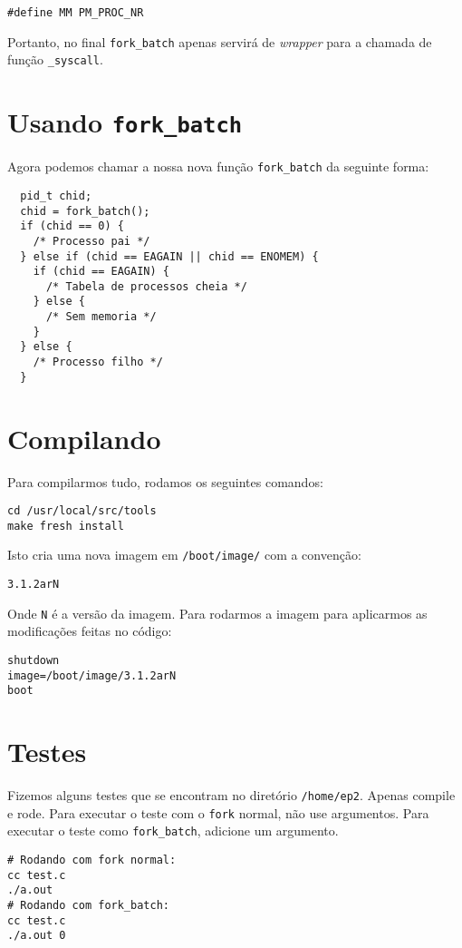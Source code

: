\documentclass{amsart}
\theoremstyle{plain}
\newcommand{\code}[1]{\lstinline[mathescape=true]{#1}}
\begin{document}
\begin{lstlisting}[frame=leftline,mathescape=true,style=nonumbers]
#define MM PM_PROC_NR
\end{lstlisting}

Portanto, no final \code{fork_batch} apenas servirá de \textit{wrapper} para a chamada de função
\code{_syscall}.

\section{Usando \code{fork_batch}}

Agora podemos chamar a nossa nova função \code{fork_batch} da seguinte forma:

\begin{verbatim}
  pid_t chid;
  chid = fork_batch();
  if (chid == 0) {
    /* Processo pai */
  } else if (chid == EAGAIN || chid == ENOMEM) {
    if (chid == EAGAIN) {
      /* Tabela de processos cheia */
    } else {
      /* Sem memoria */
    }
  } else {
    /* Processo filho */
  }
\end{verbatim}

\section{Compilando}

Para compilarmos tudo, rodamos os seguintes comandos:

\begin{lstlisting}[frame=leftline,mathescape=true,style=nonumbers]
cd /usr/local/src/tools
make fresh install
\end{lstlisting}

Isto cria uma nova imagem em \code{/boot/image/} com a convenção:

\begin{lstlisting}[frame=leftline,mathescape=true,style=nonumbers]
3.1.2arN
\end{lstlisting}

Onde \code{N} é a versão da imagem. Para rodarmos a imagem para aplicarmos as modificações feitas
no código:

\begin{lstlisting}[frame=leftline,mathescape=true,style=nonumbers]
shutdown
image=/boot/image/3.1.2arN
boot
\end{lstlisting}

\section{Testes}

Fizemos alguns testes que se encontram no diretório \code{/home/ep2}. Apenas compile e rode. Para
executar o teste com o \code{fork} normal, não use argumentos. Para executar o teste como
\code{fork_batch}, adicione um argumento.

\begin{lstlisting}[frame=leftline,mathescape=true,style=nonumbers]
# Rodando com fork normal:
cc test.c
./a.out
# Rodando com fork_batch:
cc test.c
./a.out 0
\end{lstlisting}
\end{document}
